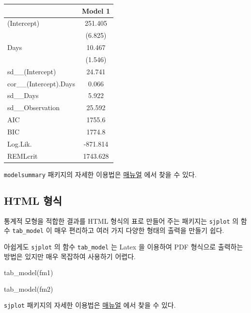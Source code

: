 \documentclass[
]{book}
\newenvironment{Shaded}{\begin{snugshade}}{\end{snugshade}}
\newcommand{\FunctionTok}[1]{\textcolor[rgb]{0.00,0.00,0.00}{#1}}
\newcommand{\NormalTok}[1]{#1}
\theoremstyle{definition}
\theoremstyle{definition}
\theoremstyle{definition}
\theoremstyle{definition}
\theoremstyle{remark}
\begin{document}
\begin{table}
\centering
\begin{tabular}[t]{lc}
\toprule
  & Model 1\\
\midrule
(Intercept) & 251.405\\
 & (6.825)\\
Days & 10.467\\
 & (1.546)\\
sd\_\_(Intercept) & 24.741\\
cor\_\_(Intercept).Days & 0.066\\
sd\_\_Days & 5.922\\
sd\_\_Observation & 25.592\\
\midrule
AIC & 1755.6\\
BIC & 1774.8\\
Log.Lik. & -871.814\\
REMLcrit & 1743.628\\
\bottomrule
\end{tabular}
\end{table}

\texttt{modelsummary} 패키지의 자세한 이용법은 \href{https://vincentarelbundock.github.io/modelsummary/index.html}{매뉴얼} 에서 찾을 수 있다.

\hypertarget{html-uxd615uxc2dd}{%
\subsection{HTML 형식}\label{html-uxd615uxc2dd}}

통계적 모형을 적합한 결과를 HTML 형식의 표로 만들어 주는 패키지는
\texttt{sjplot} 의 함수 \texttt{tab\_model} 이 매우 편리하고 여러 가지 다양한 형태의 출력을 만들기 쉽다.

아쉽게도 \texttt{sjplot} 의 함수 \texttt{tab\_model} 는 Latex 을 이용하여 PDF 형식으로 출력하는 방법은 있지만 매우 목잡하여 사용하기 어렵다.

\begin{Shaded}
\begin{Highlighting}[]
\FunctionTok{tab\_model}\NormalTok{(fm1)}
\end{Highlighting}
\end{Shaded}

\begin{Shaded}
\begin{Highlighting}[]
\FunctionTok{tab\_model}\NormalTok{(fm2)}
\end{Highlighting}
\end{Shaded}

\texttt{sjplot} 패키지의 자세한 이용법은 \href{https://strengejacke.github.io/sjPlot/index.html}{매뉴얼} 에서 찾을 수 있다.
\end{document}
